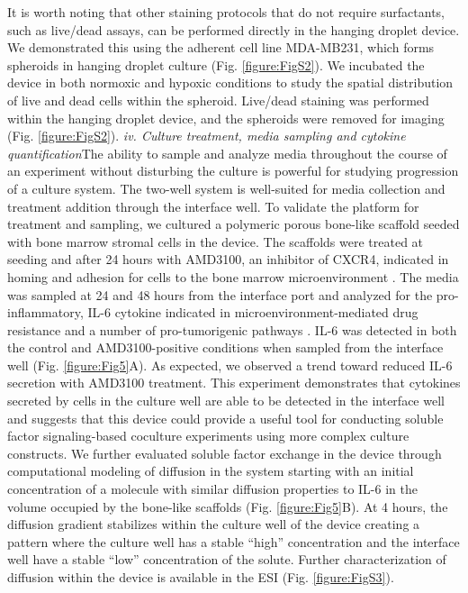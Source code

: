 It is worth noting that other staining protocols that do not require surfactants, such as live/dead assays, can be performed directly in the hanging droplet device. We demonstrated this using the adherent cell line MDA-MB231, which forms spheroids in hanging droplet culture (Fig. \ref{figure:FigS2}). We incubated the device in both normoxic and hypoxic conditions to study the spatial distribution of live and dead cells within the spheroid. Live/dead staining was performed within the hanging droplet device, and the spheroids were removed for imaging (Fig. \ref{figure:FigS2}). 
\newline
\textit{iv. Culture treatment, media sampling and cytokine quantification}The ability to sample and analyze media throughout the course of an experiment without disturbing the culture is powerful for studying progression of a culture system. The two-well system is well-suited for media collection and treatment addition through the interface well. To validate the platform for treatment and sampling, we cultured a polymeric porous bone-like scaffold seeded with bone marrow stromal cells in the device. The scaffolds were treated at seeding and after 24 hours with AMD3100, an inhibitor of CXCR4, indicated in homing and adhesion for cells to the bone marrow microenvironment \cite{Alsayed2007, Burger2006}. The media was sampled at 24 and 48 hours from the interface port and analyzed for the pro-inflammatory, IL-6 cytokine indicated in microenvironment-mediated drug resistance and a number of pro-tumorigenic pathways \cite{Hodge2005, Roodman2001a, Vincent2005, Lin2007}. IL-6 was detected in both the control and AMD3100-positive conditions when sampled from the interface well (Fig. \ref{figure:Fig5}A). As expected, we observed a trend toward reduced IL-6 secretion with AMD3100 treatment. This experiment demonstrates that cytokines secreted by cells in the culture well are able to be detected in the interface well and suggests that this device could provide a useful tool for conducting soluble factor signaling-based coculture experiments using more complex culture constructs. We further evaluated soluble factor exchange in the device through computational modeling of diffusion in the system starting with an initial concentration of a molecule with similar diffusion properties to IL-6 in the volume occupied by the bone-like scaffolds (Fig. \ref{figure:Fig5}B). At 4 hours, the diffusion gradient stabilizes within the culture well of the device creating a pattern where the culture well has a stable “high” concentration and the interface well have a stable “low” concentration of the solute. Further characterization of diffusion within the device is available in the ESI (Fig. \ref{figure:FigS3}).    

